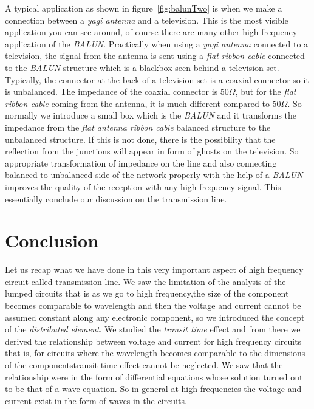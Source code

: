 A typical application as shown in figure~\ref{fig:balunTwo} is when we make a connection between a \emph{yagi antenna} and a television. This is the most visible application you can see around, of course there are many other high frequency application of the \emph{BALUN}. Practically when using a \emph{yagi antenna} connected to a television, the signal from the antenna is sent using a \emph{flat ribbon cable} connected to the \emph{BALUN} structure which is a blackbox seen behind a television set. Typically, the connector at the back of a television set is a coaxial connector so it is unbalanced. The impedance of the coaxial connector is 50$\varOmega$, but for the \emph{flat ribbon cable} coming from the antenna, it is much different compared to 50$\varOmega$. So normally we introduce a small box which is the \emph{BALUN} and it transforms the impedance from the \emph{flat antenna ribbon cable} balanced structure to the unbalanced structure. If this is not done, there is the possibility that the reflection from the junctions will appear in form of ghosts on the television. So appropriate transformation of impedance on the line and also connecting balanced to unbalanced side of the network properly with the help of a \emph{BALUN} improves the quality of the reception with any high frequency signal. This essentially conclude our discussion on the transmission line.

\section{Conclusion}
Let us recap what we have done in this very important aspect of high frequency circuit called transmission line. We saw the limitation of the analysis of the lumped circuits that is as we go to high frequency,the size of the component becomes comparable to wavelength and then the voltage and current cannot be assumed constant along any electronic component, so we introduced the concept of the \emph{distributed element}. We studied the \emph{transit time} effect and from there we derived the relationship between voltage and current for high frequency circuits that is, for circuits where the wavelength becomes comparable to the dimensions of the components\textemdash\;transit time effect cannot be neglected. We saw that the relationship were in the form of differential equations whose solution turned out to be that of a wave equation. So in general at high frequencies the voltage and current exist in the form of waves in the circuits.

